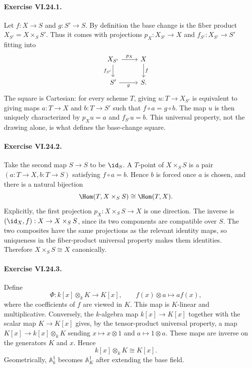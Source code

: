 \paragraph{Exercise VI.24.1.}
\begin{solution}
Let $f:X\to S$ and $g:S'\to S$.  By definition the base change is the fiber product
$X_{S'}=X\times_S S'$.  Thus it comes with projections $p_X:X_{S'}\to X$ and
$f_{S'}:X_{S'}\to S'$ fitting into
\[
\begin{tikzcd}
X_{S'} \arrow[r,"p_X"] \arrow[d,"f_{S'}"'] & X \arrow[d,"f"]\\
S' \arrow[r,"g"'] & S .
\end{tikzcd}
\]
The square is Cartesian: for every scheme $T$, giving $u:T\to X_{S'}$ is equivalent to giving
maps $a:T\to X$ and $b:T\to S'$ such that $f\circ a=g\circ b$.  The map $u$ is then uniquely
characterized by $p_Xu=a$ and $f_{S'}u=b$.  This universal property, not the drawing alone, is
what defines the base-change square.
\end{solution}

\paragraph{Exercise VI.24.2.}
\begin{solution}
Take the second map $S\to S$ to be $\id_S$.  A $T$-point of $X\times_S S$ is a pair
$(a:T\to X,b:T\to S)$ satisfying $f\circ a=b$.  Hence $b$ is forced once $a$ is chosen, and
there is a natural bijection
\[
\Hom(T,X\times_S S)\cong\Hom(T,X).
\]
Explicitly, the first projection $p_X:X\times_SS\to X$ is one direction.  The inverse is
$(\id_X,f):X\to X\times_SS$, since its two components are compatible over $S$.  The two composites
have the same projections as the relevant identity maps, so uniqueness in the fiber-product
universal property makes them identities.  Therefore $X\times_SS\cong X$ canonically.
\end{solution}

\paragraph{Exercise VI.24.3.}
\begin{solution}
Define
\[
\Phi:k[x]\otimes_k K\longrightarrow K[x],\qquad f(x)\otimes a\longmapsto a f(x),
\]
where the coefficients of $f$ are viewed in $K$.  This map is $K$-linear and multiplicative.
Conversely, the $k$-algebra map $k[x]\to K[x]$ together with the scalar map $K\to K[x]$ gives,
by the tensor-product universal property, a map $K[x]\to k[x]\otimes_kK$ sending
$x\mapsto x\otimes1$ and $a\mapsto1\otimes a$.  These maps are inverse on the generators
$K$ and $x$.  Hence
\[
k[x]\otimes_kK\cong K[x].
\]
Geometrically, $\mathbb A^1_k$ becomes $\mathbb A^1_K$ after extending the base field.
\end{solution}


